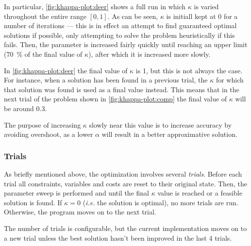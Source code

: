 In particular, \cref{fig:khappa-plot:deer} shows a full run in which \(\kappa\) is varied throughout the entire range \([0,1]\).
As can be seen, \(\kappa\) is initiall kept at 0 for a number of iterations --- this is in effect an attempt to find guaranteed optimal solutions if possible, only attempting to solve the problem heuristically if this fails.
Then, the parameter is increased fairly quickly until reaching an upper limit (\SI{70}{\percent} of the final value of \(\kappa\)), after which it is increased more slowly.

In \cref{fig:khappa-plot:deer} the final value of \(\kappa\) is 1, but this is not always the case.
For instance, when a solution has been found in a previous trial, the \(\kappa\) for which that solution was found is used as a final value instead.
This means that in the next trial of the problem shown in \cref{fig:khappa-plot:comp} the final value of \(\kappa\) will be around \num{0.3}.

The purpose of increasing \(\kappa\) slowly near this value is to increase accuracy by avoiding overshoot, as a lower \(\alpha\) will result in a better approximative solution.

\subsubsection{Trials}
As briefly mentioned above, the optimization involves several \emph{trials}.
Before each trial all constraints, variables and costs are reset to their original state.
Then, the parameter sweep is performed and until the final \(\kappa\) value is reached or a feasible solution is found.
If \(\kappa=0\) (\emph{i.e.} the solution is optimal), no more trials are run.
Otherwise, the program moves on to the next trial.

The number of trials is configurable, but the current implementation moves on to a new trial unless the best solution hasn't been improved in the last 4 trials.
